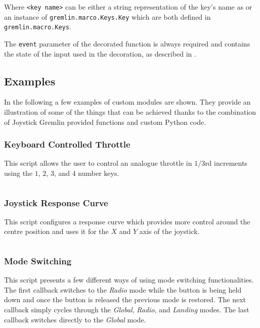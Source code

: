 \documentclass[a4, 10pt]{article}
\newcommand{\JG}{Joystick Gremlin}
\begin{document}
Where \verb+<key name>+ can be either a string representation of the
key's name as or an instance of \verb+gremlin.marco.Keys.Key+ which are
both defined in\\\verb+gremlin.macro.Keys+.

The \verb+event+ parameter of the decorated function is always required
and contains the state of the input used in the decoration, as described
in .


\subsection{Examples}
\label{sec:cm_examples}

In the following a few examples of custom modules are shown. They
provide an illustration of some of the things that can be achieved
thanks to the combination of \JG{} provided functions and custom Python
code.


\subsubsection{Keyboard Controlled Throttle}

This script allows the user to control an analogue throttle in $1/3$rd
increments using the $1$, $2$, $3$, and $4$ number keys.

\inputminted[xleftmargin=2em]{python}{examples/keyboard_throttle.py}


\subsubsection{Joystick Response Curve}

This script configures a response curve which provides more control
around the centre position and uses it for the $X$ and $Y$ axis of the
joystick.

\inputminted[xleftmargin=2em]{python}{examples/response_curve.py}


\subsubsection{Mode Switching}

This script presents a few different ways of using mode switching
functionalities. The first callback switches to the \emph{Radio} mode
while the button is being held down and once the button is released the
previous mode is restored. The next callback simply cycles through the
\emph{Global}, \emph{Radio}, and \emph{Landing} modes. The last callback
switches directly to the \emph{Global} mode.
\end{document}
